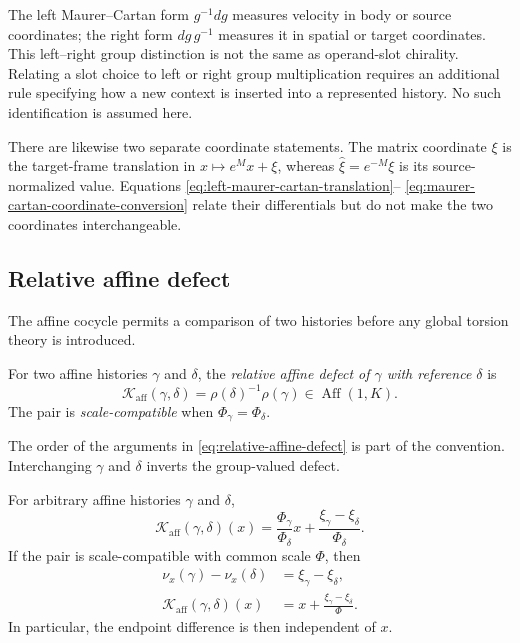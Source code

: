 The left Maurer--Cartan form $g^{-1}dg$ measures velocity in body or source
coordinates; the right form $dg\,g^{-1}$ measures it in spatial or target
coordinates.  This left--right group distinction is not the same as
operand-slot chirality.  Relating a slot choice to left or right group
multiplication requires an additional rule specifying how a new context is
inserted into a represented history.  No such identification is assumed here.

There are likewise two separate coordinate statements.  The matrix coordinate
$\xi$ is the target-frame translation in $x\mapsto e^M x+\xi$, whereas
$\widehat\xi=e^{-M}\xi$ is its source-normalized value.  Equations
\eqref{eq:left-maurer-cartan-translation}--
\eqref{eq:maurer-cartan-coordinate-conversion} relate their differentials but
do not make the two coordinates interchangeable.

\subsection{Relative affine defect}
\label{subsec:relative-affine-defect}

The affine cocycle permits a comparison of two histories before any global
torsion theory is introduced.

\begin{definition}
\label{def:relative-affine-defect}
For two affine histories $\gamma$ and $\delta$, the \emph{relative affine
defect of $\gamma$ with reference $\delta$} is
\begin{equation}
  \mathcal K_{\mathrm{aff}}(\gamma,\delta)
  =\rho(\delta)^{-1}\rho(\gamma)
  \in\operatorname{Aff}(1,K).
  \label{eq:relative-affine-defect}
\end{equation}
The pair is \emph{scale-compatible} when
$\Phi_\gamma=\Phi_\delta$.
\end{definition}

The order of the arguments in
\eqref{eq:relative-affine-defect} is part of the convention.  Interchanging
$\gamma$ and $\delta$ inverts the group-valued defect.

\begin{proposition}
\label{prop:relative-affine-defect-coordinates}
For arbitrary affine histories $\gamma$ and $\delta$,
\begin{equation}
  \mathcal K_{\mathrm{aff}}(\gamma,\delta)(x)
  =\frac{\Phi_\gamma}{\Phi_\delta}x
   +\frac{\xi_\gamma-\xi_\delta}{\Phi_\delta}.
  \label{eq:relative-affine-defect-coordinates}
\end{equation}
If the pair is scale-compatible with common scale $\Phi$, then
\begin{align}
  \nu_x(\gamma)-\nu_x(\delta)
    &=\xi_\gamma-\xi_\delta,
  \label{eq:scale-compatible-endpoint-defect}\\
  \mathcal K_{\mathrm{aff}}(\gamma,\delta)(x)
    &=x+\frac{\xi_\gamma-\xi_\delta}{\Phi}.
  \label{eq:scale-compatible-relative-translation}
\end{align}
In particular, the endpoint difference is then independent of $x$.
\end{proposition}

